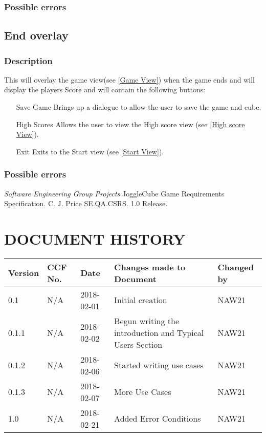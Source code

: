 \documentclass{project}
\begin{document}
\subsubsection{Possible errors}


\subsection{End overlay} \label{End Overlay}
\subsubsection{Description}
This will overlay the game view(see \ref{Game View}) when the game ends and will display the players Score and will contain the following buttons:
\begin{itemize}
\item[Save Game] Brings up a dialogue to allow the user to save the game and cube.
\item[High Scores] Allows the user to view the High score view (see \ref{High score View}).
\item[Exit] Exits to the Start view (see \ref{Start View}).
\end{itemize}
\subsubsection{Possible errors}


\clearpage
{}
\begin{thebibliography}{5}
 \emph{Software Engineering Group Projects}
JoggleCube Game Requirements Specification.
C. J. Price SE.QA.CSRS. 1.0 Release.
\end{thebibliography}
\clearpage
{}
\section*{DOCUMENT HISTORY}
\begin{tabular}{| l | l | l | l | l |}
\hline
Version & CCF No. & Date & Changes made to Document & Changed by \\
\hline
0.1 & N/A & 2018-02-01 & Initial creation & NAW21 \\
\hline
0.1.1 & N/A & 2018-02-02 & Begun writing the introduction and Typical Users Section & NAW21 \\
\hline
0.1.2 & N/A & 2018-02-06 & Started writing use cases & NAW21 \\
\hline
0.1.3 & N/A & 2018-02-07 & More Use Cases & NAW21 \\
\hline
1.0 & N/A & 2018-02-21 & Added Error Conditions & NAW21 \\
\hline
\end{tabular}
\label{thelastpage}
\end{document}
